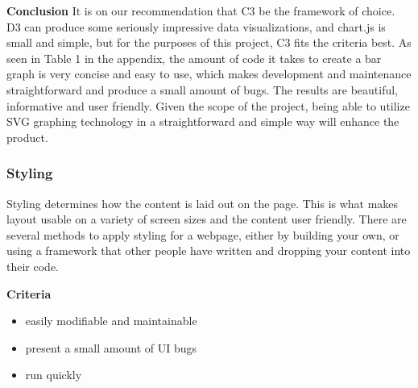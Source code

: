 \documentclass[draftclsnofoot,onecolumn,letterpaper,10pt]{IEEEtran}
\begin{document}
	\textbf{Conclusion}
	It is on our recommendation that C3 be the framework of choice.
	D3 can produce some seriously impressive data visualizations, and chart.js is small and simple, but for the purposes of this project, C3 fits the criteria best.
	As seen in Table 1 in the appendix, the amount of code it takes to create a bar graph is very concise and easy to use, which makes development and maintenance straightforward and produce a small amount of bugs.
	The results are beautiful, informative and user friendly.
	Given the scope of the project, being able to utilize SVG graphing technology in a straightforward and simple way will enhance the product.\\


	\subsubsection{Styling}


		Styling determines how the content is laid out on the page.
		This is what makes layout usable on a variety of screen sizes and the content user friendly.
		There are several methods to apply styling for a webpage, either by building your own, or using a framework that other people have written and dropping your content into their code.

		\textbf{Criteria}
		\begin{itemize}
			\item easily modifiable and maintainable
			\item present a small amount of UI bugs
			\item run quickly
		\end{itemize}
\end{document}
